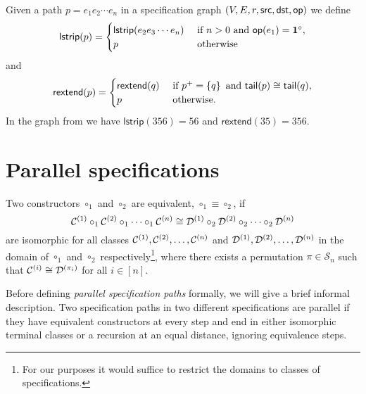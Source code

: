 Given a path $p = e_1e_2\dotsm e_n$ in a specification graph $(V,E,r,\textsf{src},\textsf{dst},\textsf{op})$ we define
\[
     \textsf{lstrip}(p) = \begin{cases} \textsf{lstrip}(e_2e_3\dotsm e_n) & \text{ if } n > 0 \text{ and } \textsf{op}(e_1) = \mathbf{1}^\circ,\\
     p & \text{ otherwise}
     \end{cases}
\]
and
\[
    \textsf{rextend}(p) = \begin{cases}
        \textsf{rextend}(q) & \text{ if } p^+ = \left\{q\right\} \text{ and } \textsf{tail}(p) \cong \textsf{tail}(q),\\
        p & \text{ otherwise}.
    \end{cases}
\]
In the graph from  we have $\textsf{lstrip}(356) = 56$ and $\textsf{rextend}(35) = 356$.

\section{Parallel specifications}
\begin{definition}
Two constructors $\circ_1$ and $\circ_2$ are equivalent, $\circ_1 \equiv \circ_2$, if
\[
    \mathcal{C}^{\left(1\right)} \circ_1 \mathcal{C}^{\left(2\right)} \circ_1 \dotsm \circ_1 \mathcal{C}^{\left(n\right)} \cong \mathcal{D}^{\left(1\right)} \circ_2 \mathcal{D}^{\left(2\right)} \circ_2 \dotsm \circ_2 \mathcal{D}^{\left(n\right)}
\]
are isomorphic for all classes $\mathcal{C}^{\left(1\right)},\mathcal{C}^{\left(2\right)},\dotsc,\mathcal{C}^{\left(n\right)}$ and $\mathcal{D}^{\left(1\right)},\mathcal{D}^{\left(2\right)},\dotsc,\mathcal{D}^{\left(n\right)}$ in the domain of $\circ_1$ and $\circ_2$ respectively\footnote{For our purposes it would suffice to restrict the domains to classes of specifications.}, where there exists a permutation $\pi\in\mathcal{S}_n$ such that  $\mathcal{C}^{\left(i\right)}\cong\mathcal{D}^{\left(\pi_i\right)}$ for all $i\in[n]$.
\end{definition}

Before defining \emph{parallel specification paths} formally, we will give a brief informal description. Two specification paths in two different specifications are parallel if they have equivalent constructors at every step and end in either isomorphic terminal classes or a recursion at an equal distance, ignoring equivalence steps.

